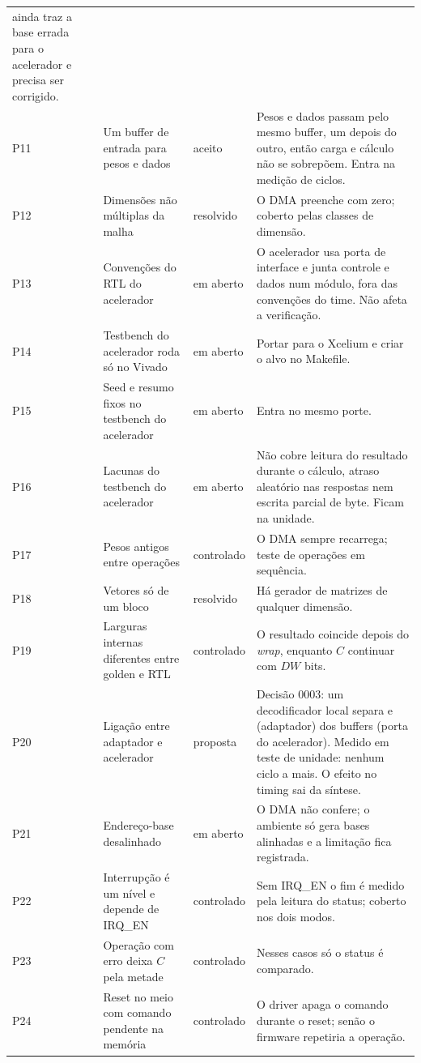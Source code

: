 \documentclass[10pt,a4paper]{article}
\newcommand{\DW}{\mathit{DW}}
\newcommand{\code}[1]{\texttt{\detokenize{#1}}}
\begin{document}
{\begin{longtable}{@{}L{0.7cm}L{4.4cm}L{2.0cm}L{7.6cm}@{}}
ainda traz a base errada para o acelerador e precisa ser corrigido.\\
P11 & Um buffer de entrada para pesos e dados & aceito & Pesos e dados passam pelo mesmo buffer, um
depois do outro, então carga e cálculo não se sobrepõem. Entra na medição de ciclos.\\
P12 & Dimensões não múltiplas da malha & resolvido & O DMA preenche com zero; coberto pelas
classes de dimensão.\\
P13 & Convenções do RTL do acelerador & em aberto & O acelerador usa porta de interface e junta
controle e dados num módulo, fora das convenções do time. Não afeta a verificação.\\
P14 & Testbench do acelerador roda só no Vivado & em aberto & Portar para o Xcelium e criar o alvo
no Makefile.\\
P15 & Seed e resumo fixos no testbench do acelerador & em aberto & Entra no mesmo porte.\\
P16 & Lacunas do testbench do acelerador & em aberto & Não cobre leitura do resultado durante o
cálculo, atraso aleatório nas respostas nem escrita parcial de byte. Ficam na unidade.\\
P17 & Pesos antigos entre operações & controlado & O DMA sempre recarrega; teste de operações em
sequência.\\
P18 & Vetores só de um bloco & resolvido & Há gerador de matrizes de qualquer dimensão.\\
P19 & Larguras internas diferentes entre golden e RTL & controlado & O resultado coincide depois do
\emph{wrap}, enquanto $C$ continuar com $\DW$ bits.\\
P20 & Ligação entre adaptador e acelerador & proposta & Decisão 0003: um decodificador local
separa \code{CTRL} e \code{STATUS} (adaptador) dos buffers (porta do acelerador). Medido em
teste de unidade: nenhum ciclo a mais. O efeito no timing sai da síntese.\\
P21 & Endereço-base desalinhado & em aberto & O DMA não confere; o ambiente só gera bases
alinhadas e a limitação fica registrada.\\
P22 & Interrupção é um nível e depende de IRQ\_EN & controlado & Sem IRQ\_EN o fim é medido pela
leitura do status; coberto nos dois modos.\\
P23 & Operação com erro deixa $C$ pela metade & controlado & Nesses casos só o status é comparado.\\
P24 & Reset no meio com comando pendente na memória & controlado & O driver apaga o comando durante
o reset; senão o firmware repetiria a operação.\\

\end{longtable}}
\end{document}

